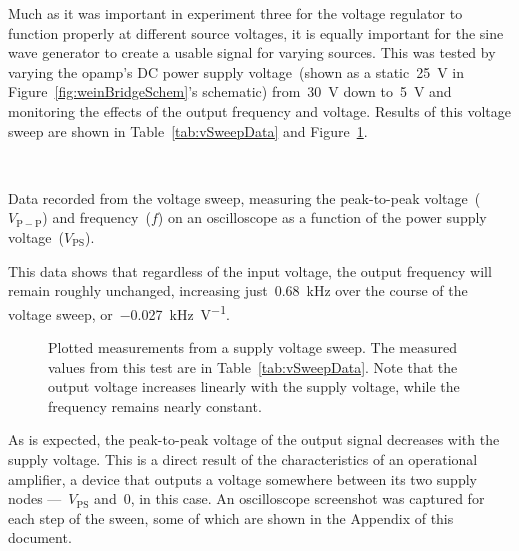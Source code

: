 Much as it was important in experiment three for the voltage regulator to
function properly at different source voltages, it is equally important for the
sine wave generator to create a usable signal for varying sources.  This was
tested by varying the opamp's DC power supply voltage~(shown as a
static~\SI{25}{\volt} in Figure~\ref{fig:weinBridgeSchem}'s schematic)
from~\SI{30}{\volt} down to~\SI{5}{\volt} and monitoring the effects of the
output frequency and voltage.  Results of this voltage sweep are shown in
Table~\ref{tab:vSweepData} and Figure~\ref{fig:vSweepPlot}.
%
\begin{table}[H]
	\centering
	\\
	\parbox{.6\textwidth}{
	\caption[Voltage Sweep Data]{Data recorded from the voltage sweep,
		measuring the peak-to-peak voltage~($V_\mathrm{P-P}$) and
		frequency~($f$) on an oscilloscope as a function of the power supply
		voltage~($V_\mathrm{PS}$).}
	\label{tab:vSweepData}}
\end{table}
%
This data shows that regardless of the input voltage, the output frequency will
remain roughly unchanged, increasing just~\SI{0.68}{\kilo\hertz} over the
course of the voltage sweep, or~\SI{-0.027}{\kilo\hertz\per\volt}.
%
\begin{figure}[H]
	\centering
	
	\parbox{4.25in}{
	\caption[Voltage Sweep Plot]{Plotted measurements from a supply voltage
	sweep.  The measured values from this test are in
	Table~\ref{tab:vSweepData}.  Note that the output voltage increases
	linearly with the supply voltage, while the frequency remains nearly
	constant.}
	\label{fig:vSweepPlot}}
\end{figure}
%
As is expected, the peak-to-peak voltage of the output signal decreases with
the supply voltage.  This is a direct result of the characteristics of an
operational amplifier, a device that outputs a voltage somewhere between its
two supply nodes ---~$V_\text{PS}$ and~0, in this case.  An oscilloscope
screenshot was captured for each step of the sween, some of which are shown in
the Appendix  of this document.




